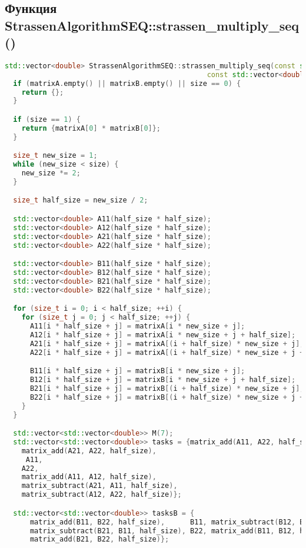 \documentclass[a4paper,12pt]{article}
\begin{document}
\subsection*{Функция StrassenAlgorithmSEQ::strassen\_multiply\_seq()}
\begin{lstlisting}[language=C++]
std::vector<double> StrassenAlgorithmSEQ::strassen_multiply_seq(const std::vector<double>& matrixA,
                                                const std::vector<double>& matrixB, size_t size) {
  if (matrixA.empty() || matrixB.empty() || size == 0) {
    return {};
  }

  if (size == 1) {
    return {matrixA[0] * matrixB[0]};
  }

  size_t new_size = 1;
  while (new_size < size) {
    new_size *= 2;
  }

  size_t half_size = new_size / 2;

  std::vector<double> A11(half_size * half_size);
  std::vector<double> A12(half_size * half_size);
  std::vector<double> A21(half_size * half_size);
  std::vector<double> A22(half_size * half_size);

  std::vector<double> B11(half_size * half_size);
  std::vector<double> B12(half_size * half_size);
  std::vector<double> B21(half_size * half_size);
  std::vector<double> B22(half_size * half_size);

  for (size_t i = 0; i < half_size; ++i) {
    for (size_t j = 0; j < half_size; ++j) {
      A11[i * half_size + j] = matrixA[i * new_size + j];
      A12[i * half_size + j] = matrixA[i * new_size + j + half_size];
      A21[i * half_size + j] = matrixA[(i + half_size) * new_size + j];
      A22[i * half_size + j] = matrixA[(i + half_size) * new_size + j + half_size];

      B11[i * half_size + j] = matrixB[i * new_size + j];
      B12[i * half_size + j] = matrixB[i * new_size + j + half_size];
      B21[i * half_size + j] = matrixB[(i + half_size) * new_size + j];
      B22[i * half_size + j] = matrixB[(i + half_size) * new_size + j + half_size];
    }
  }

  std::vector<std::vector<double>> M(7);
  std::vector<std::vector<double>> tasks = {matrix_add(A11, A22, half_size),
    matrix_add(A21, A22, half_size),
     A11,
    A22,
    matrix_add(A11, A12, half_size),
    matrix_subtract(A21, A11, half_size),
    matrix_subtract(A12, A22, half_size)};

  std::vector<std::vector<double>> tasksB = {
      matrix_add(B11, B22, half_size),      B11, matrix_subtract(B12, B22, half_size),
      matrix_subtract(B21, B11, half_size), B22, matrix_add(B11, B12, half_size),
      matrix_add(B21, B22, half_size)};


\end{lstlisting}
\end{document}
